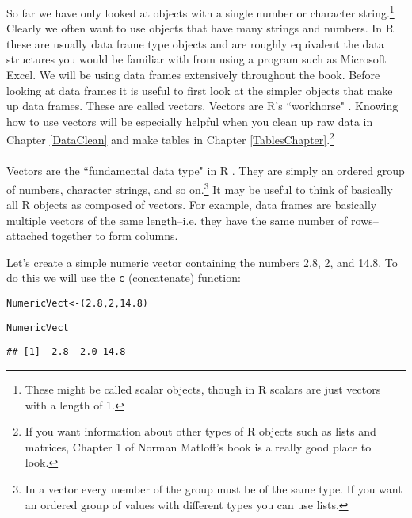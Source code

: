 So far we have only looked at objects with a single number or character string.\footnote{These might be called scalar objects, though in R scalars are just vectors with a length of 1.} Clearly we often want to use objects that have many strings and numbers. In R these are usually data frame type objects and are roughly equivalent the data structures you would be familiar with from using a program such as Microsoft Excel. We will be using data frames extensively throughout the book. Before looking at data frames it is useful to first look at the simpler objects that make up data frames. These are called vectors. Vectors are R's ``workhorse" \cite[]{Matloff2011}. Knowing how to use vectors will be especially helpful when you clean up raw data in Chapter \ref{DataClean} and make tables in Chapter \ref{TablesChapter}.\footnote{If you want information about other types of R objects such as lists and matrices, Chapter 1 of Norman Matloff's book\citeyearpar{Matloff2011} is a really good place to look.} \\[0.25cm]

 \\[0.25cm] Vectors are the ``fundamental data type" in R \cite[]{Matloff2011}. They are simply an ordered group of numbers, character strings, and so on.\footnote{In a vector every member of the group must be of the same type. If you want an ordered group of values with different types you can use lists.} It may be useful to think of basically all R objects as composed of vectors. For example, data frames are basically multiple vectors of the same length--i.e. they have the same number of rows--attached together to form columns. 

Let's create a simple numeric vector containing the numbers 2.8, 2, and 14.8. To do this we will use the \texttt{c} (concatenate) function:

\begin{knitrout}
\color{fgcolor}\begin{kframe}
\begin{alltt}
NumericVect <- (2.8, 2, 14.8)

NumericVect
\end{alltt}
\begin{verbatim}
## [1]  2.8  2.0 14.8
\end{verbatim}
\end{kframe}
\end{knitrout}


